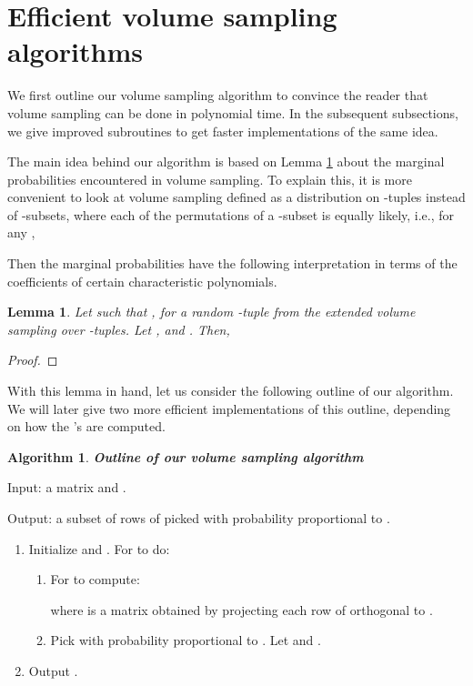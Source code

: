 \documentclass[11pt]{article}
\newtheorem{lemma}[theorem]{Lemma}
\newtheorem{alg}{Algorithm}
\begin{document}
\section{Efficient volume sampling algorithms} \label{sec:algo-outline}
We first outline our volume sampling algorithm to convince the reader that volume sampling can be done in polynomial time. In the subsequent subsections, we give improved subroutines to get faster implementations of the same idea.

The main idea behind our algorithm is based on Lemma \ref{lemma:marginals} about the marginal probabilities encountered in volume sampling. To explain this, it is more convenient to look at volume sampling defined as a distribution on -tuples  instead of -subsets, where each of the  permutations of a -subset is equally likely, i.e., for any ,

Then the marginal probabilities  have the following interpretation in terms of the coefficients of certain characteristic polynomials.
\begin{lemma} \label{lemma:marginals}
Let  such that , for a random -tuple  from the extended volume sampling over -tuples. Let ,  and . Then, 
\end{lemma}
\begin{proof}

\end{proof}


With this lemma in hand, let us consider the following outline of our algorithm. We will later give two more efficient implementations of this outline, depending on how the 's are computed.

\begin{framed}
\begin{alg}\label{alg:outline}
{\bf Outline of our volume sampling algorithm}
\end{alg}
\noindent Input: a matrix  and .

\noindent Output: a subset  of  rows of  picked with probability proportional to .

\begin{enumerate}
\item Initialize  and . For  to  do:
\begin{enumerate}
\item For  to  compute:

where  is a matrix obtained by projecting each row of  orthogonal to .
\item Pick  with probability proportional to . Let  and .
\end{enumerate}
\item Output .
\end{enumerate}
\end{framed}
\end{document}
